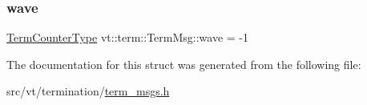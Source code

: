 \mbox{\label{structvt_1_1term_1_1_term_msg_a4090f02c6dae636a0c2b31c101532255}} 
\subsubsection{\texorpdfstring{wave}{wave}}
{\footnotesize\ttfamily \hyperlink{namespacevt_1_1term_a4fd378cdb0c36683afc1b3399d685f7f}{Term\+Counter\+Type} vt\+::term\+::\+Term\+Msg\+::wave = -\/1}



The documentation for this struct was generated from the following file\+:\begin{DoxyCompactItemize}
\item 
src/vt/termination/\hyperlink{term__msgs_8h}{term\+\_\+msgs.\+h}\end{DoxyCompactItemize}

